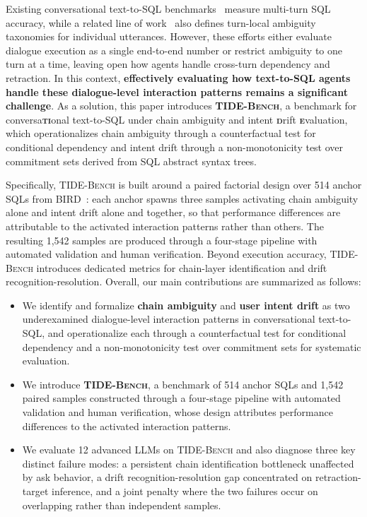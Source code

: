 Existing conversational text-to-SQL benchmarks~\cite{yu2019sparc,yu2019cosql,sun2025dysql,huo2026interact} measure multi-turn SQL accuracy, while a related line of work~\cite{bhaskar2023ambiqt,saparina2024ambrosia,dong2025practiq,ding2026ambisql} also defines turn-local ambiguity taxonomies for individual utterances.
However, these efforts either evaluate dialogue execution as a single end-to-end number or restrict ambiguity to one turn at a time, leaving open how agents handle cross-turn dependency and retraction. In this context, \textbf{effectively evaluating how text-to-SQL agents handle these dialogue-level interaction patterns remains a significant challenge}. As a solution, this paper introduces \textbf{\textsc{TIDE-Bench}}, a benchmark for conversa\textbf{\textsc{ti}}onal text-to-SQL under chain ambiguity and intent \textbf{\textsc{d}}rift \textbf{\textsc{e}}valuation, which operationalizes chain ambiguity through a counterfactual test for conditional dependency and intent drift through a non-monotonicity test over commitment sets derived from SQL abstract syntax trees.

Specifically, \textsc{TIDE-Bench} is built around a paired factorial design over 514 anchor SQLs from BIRD~\cite{li2023bird}: each anchor spawns three samples activating chain ambiguity alone and intent drift alone and together, so that performance differences are attributable to the activated interaction patterns rather than others. The resulting 1,542 samples are produced through a four-stage pipeline with automated validation and human verification. Beyond execution accuracy, \textsc{TIDE-Bench} introduces dedicated metrics for chain-layer identification and drift recognition-resolution. Overall, our main contributions are summarized as follows:
\vspace{-1mm}
\begin{itemize}
\item We identify and formalize \textbf{chain ambiguity} and \textbf{user intent drift} as two underexamined dialogue-level interaction patterns in conversational text-to-SQL, and operationalize each through a counterfactual test for conditional dependency and a non-monotonicity test over commitment sets for systematic evaluation.
\vspace{-2mm}
\item We introduce \textbf{\textsc{TIDE-Bench}}, a benchmark of 514 anchor SQLs and 1,542 paired samples constructed through a four-stage pipeline with automated validation and human verification, whose design attributes performance differences to the activated interaction patterns.
\vspace{-2mm}
\item We evaluate 12 advanced LLMs on \textsc{TIDE-Bench} and also diagnose three key distinct failure modes: a persistent chain identification bottleneck unaffected by ask behavior, a drift recognition-resolution gap concentrated on retraction-target inference, and a joint penalty where the two failures occur on overlapping rather than independent samples.
\end{itemize}